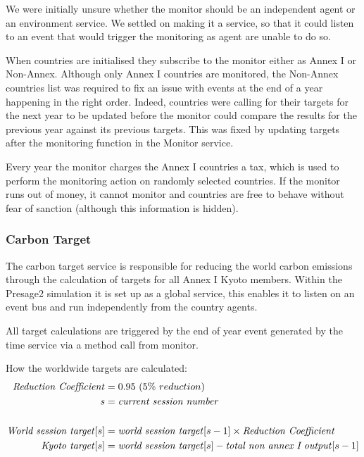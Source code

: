 We were initially unsure whether the monitor should be an independent agent or an environment service. We settled on making it a service, so that it could listen to an event that would trigger the monitoring as agent are unable to do so.

When countries are initialised they subscribe to the monitor either as Annex I or Non-Annex. Although only Annex I countries are monitored, the Non-Annex countries list was required to fix an issue with events at the end of a year happening in the right order. Indeed, countries were calling for their targets for the next year to be updated before the monitor could compare the results for the previous year against its previous targets. This was fixed by updating targets after the monitoring function in the Monitor service.

Every year the monitor charges the Annex I countries a tax, which is used to perform the monitoring action on randomly selected countries. If the monitor runs out of money, it cannot monitor and countries are free to behave without fear of sanction (although this information is hidden).

\subsubsection{Carbon Target}

The carbon target service is responsible for reducing the world carbon emissions through the calculation of targets for all Annex I Kyoto members. Within the Presage2 simulation it is set up as a global service, this enables it to listen on an event bus and run independently from the country agents.
 
All target calculations are triggered by the end of year event generated by the time service via a method call from monitor.

How the worldwide targets are calculated:
\begin{align*}
\text{\emph{Reduction Coefficient}}&= 0.95 ~ (5\%~reduction) \\
s &= \text{\emph{current session number}}\\
\\
\text{\emph{World session target}}[s] &= \text{\emph{world session target}} [s - 1] \times \text{\emph{Reduction Coefficient}}\\
\text{\emph{Kyoto target}}[s] &= \text{\emph{world session target}}[s] - \text{\emph{total non annex I output}}[s - 1]\\
\end{align*}

